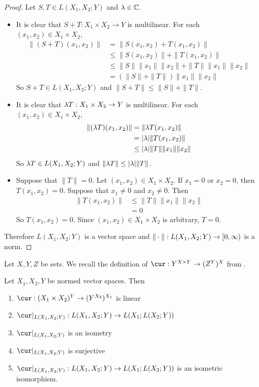 \documentclass{book}
\begin{document}
	\begin{proof}
		Let $S,T \in L(X_1,X_2;Y)$ and $\lambda \in \mathbb{C}$.
		\begin{itemize}
			\item It is clear that $S+T : X_1 \times X_2 \rightarrow Y$ is multilinear. For each $(x_1, x_2) \in X_1 \times X_2$,
			\begin{align*}
				\|(S+T)(x_1, x_2)\|
				& = \|S(x_1, x_2) + T(x_1, x_2)\| \\
				& \leq  \|S(x_1, x_2) \| + \|T(x_1, x_2)\| \\
				& \leq \|S\|\|x_1\| \|x_2\| + \|T\|\|x_1\| \|x_2\| \\
				& = (\|S\| + \|T\|)\|x_1\| \|x_2\|
			\end{align*}
			So $S+T \in L(X_1, X_2;Y)$ and $\|S+T\|\leq \|S \|+ \|T \|$.
			\item It is clear that $\lambda T : X_1 \times X_2 \rightarrow Y$ is multilinear. For each $(x_1, x_2) \in X_1 \times X_2$,
			\begin{align*}
				\|(\lambda T)(x_1, x_2)\| 
				& = \|\lambda T(x_1, x_2)\| \\
				& = |\lambda| \|T(x_1, x_2)\| \\
				& \leq |\lambda| \|T\| \|x_1\| \|x_2\|
			\end{align*}
			So $\lambda T \in L(X_1, X_2;Y)$ and $\|\lambda T\| \leq |\lambda| \|T\|$.
			\item Suppose that $\|T\| = 0$. Let $(x_1, x_2) \in X_1 \times X_2$. If $x_1 = 0$ or $x_2 = 0$, then $T(x_1,x_2) = 0$. Suppose that $x_1 \neq 0$ and $x_2 \neq 0$. Then 
			\begin{align*}
				\|T(x_1, x_2)\|
				& \leq  \|T\|\|x_1\|\|x_2\| \\
				& = 0
			\end{align*}
			So $T(x_1, x_2) = 0$. Since $(x_1, x_2) \in X_1 \times X_2$ is arbitrary, $T = 0$.
		\end{itemize}
		Therefore $L(X_1, X_2; Y)$ is a vector space and $\|\cdot\|: L(X_1, X_2; Y) \rightarrow [0,\infty)$ is a norm.
	\end{proof}

	\begin{note}
	Let $X, Y, Z$ be sets. We recall the definition of $\cur: Y^{X \times Y} \rightarrow (Z^Y)^X$ from .
	\end{note}
	
	\begin{ex} 
	Let $X_1, X_2, Y$ be normed vector spaces. Then 
	\begin{enumerate}
		\item $\cur: (X_1 \times X_2)^Y \rightarrow (Y^{X_2})^{X_1}$ is linear
		\item $\cur|_{L(X_1, X_2;Y)}: L(X_1, X_2;Y) \rightarrow L(X_1; L(X_2;Y))$
		\item $\cur|_{L(X_1, X_2;Y)}$ is an isometry
		\item $\cur|_{L(X_1, X_2;Y)}$ is surjective
		\item $\cur|_{L(X_1, X_2;Y)}: L(X_1, X_2;Y) \rightarrow L(X_1; L(X_2;Y))$ is an isometric isomorphism.
	\end{enumerate}
	\end{ex}
	
\end{document}
